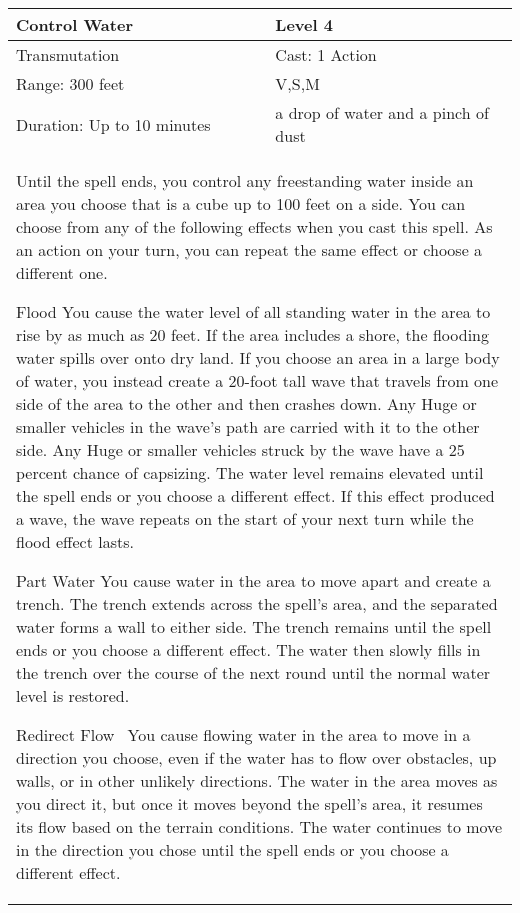 \documentclass[11pt]{report}
\begin{document}
\begin{table}[H]
	\begin{tabular}{||p{6cm}|p{6cm}||}
		\hline\hline
		\bf{Control Water} & Level 4\\ \hline
		Transmutation & Cast: 1 Action\\ \hline
		Range: 300 feet & V,S,M \\ \hline
		Duration: Up to 10 minutes & a drop of water and a pinch of dust\\ \hline
		\multicolumn{2}{||p{12cm}||}{Until the spell ends, you control any freestanding water inside an area you choose that is a cube up to 100 feet on a side. 
You can choose from any of the following effects when you cast this spell. As an action on your turn, you can repeat the same effect or choose a different one. 

Flood 
You cause the water level of all standing water in the area to rise by as much as 20 feet. If the area includes a shore, the flooding water spills over onto dry land. If you choose an area in a large body of water, you instead create a 20-foot tall wave that travels from one side of the area to the other and then crashes down. Any Huge or smaller vehicles in the wave’s path are carried with it to the other side. Any Huge or smaller vehicles struck by the wave have a 25 percent chance of capsizing. The water level remains elevated until the spell ends or you choose a different effect. If this effect produced a wave, the wave repeats on the start of your next turn while the flood effect lasts. 

Part Water 
You cause water in the area to move apart and create a trench. The trench extends across the spell’s area, and the separated water forms a wall to either side. The trench remains until the spell ends or you choose a different effect. The water then slowly fills in the trench over the course of the next round until the normal water level is restored. 

Redirect Flow 
You cause flowing water in the area to move in a direction you choose, even if the water has to flow over obstacles, up walls, or in other unlikely directions. The water in the area moves as you direct it, but once it moves beyond the spell’s area, it resumes its flow based on the terrain conditions. The water continues to move in the direction you chose until the spell ends or you choose a different effect. 

}
\end{tabular}
\end{table}
\end{document}
